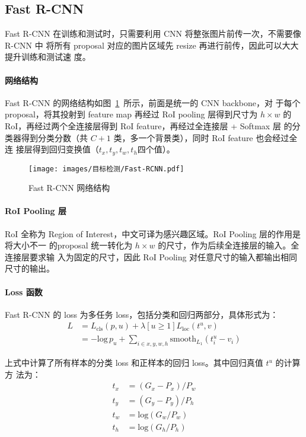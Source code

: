 \subsection{Fast R-CNN}
\label{subsec:Fast-R-CNN}

Fast R-CNN 在训练和测试时，只需要利用 CNN 将整张图片前传一次，不需要像 R-CNN 中
将所有 proposal 对应的图片区域先 resize 再进行前传，因此可以大大提升训练和测试速
度。

\paragraph{网络结构} 

Fast R-CNN 的网络结构如图~\ref{fig:Fast-RCNN}~所示，前面是统一的 CNN backbone，对
于每个 proposal，将其投射到 feature map 再经过 RoI pooling 层得到尺寸为 $h
\times w$ 的 RoI，再经过两个全连接层得到 RoI feature，再经过全连接层 + Softmax 层
的分类器得到分类分数（共 $C+1$ 类，多一个背景类），同时 RoI feature 也会经过全连
接层得到回归变换值（$t_x, t_y, t_w, t_h$四个值）。

\begin{figure}[ht]
  \centering
  \texttt{[image: images/目标检测/Fast-RCNN.pdf]}
  \caption{Fast R-CNN 网络结构}
  \label{fig:Fast-RCNN}
\end{figure}

\paragraph{RoI Pooling 层}

RoI 全称为 Region of Interest，中文可译为感兴趣区域。RoI Pooling 层的作用是将大小不一
的proposal 统一转化为 $h \times w$ 的尺寸，作为后续全连接层的输入。全连接层要求输
入为固定的尺寸，因此 RoI Pooling 对任意尺寸的输入都输出相同尺寸的输出。

\paragraph{Loss 函数}

Fast R-CNN 的 loss 为多任务 loss，包括分类和回归两部分，具体形式为：
\begin{align}
  L & = L_{\mathrm{cls}}(p, u) + \lambda [u \geq 1] L_{\mathrm{loc}}(t^u, v) \\ 
    & = -\mathrm{log}\,p_u + \sum_{i \in {x, y, w, h}} \mathrm{smooth}_{L_1}(t_i^u - v_i)
\end{align}

上式中计算了所有样本的分类 loss 和正样本的回归 loss。其中回归真值 $t^u$ 的计算方
法为：
\begin{align}
  t_x & = (G_x - P_x) / P_w \\
  t_y & = (G_y - P_y) / P_h \\
  t_w & = \mathrm{log} (G_w/P_w) \\
  t_h & = \mathrm{log} (G_h/P_h)
\end{align}

